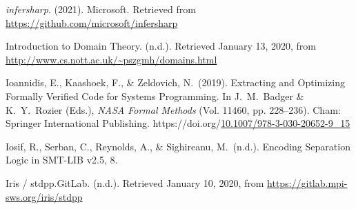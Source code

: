\documentclass[12pt,twoside]{article}
\begin{document}
{\begin{thebibliography}{1079}
\mdbibitemlabel{}\emph{infersharp}. (2021). Microsoft. Retrieved from \href{https://github.com/microsoft/infersharp}{{\ttfamily https://\hspace{0pt}github.\hspace{0pt}com/\hspace{0pt}microsoft/\hspace{0pt}infersharp}}%

\mdbibitemlabel{}Introduction to Domain Theory. (n.d.). Retrieved January 13, 2020, from \href{http://www.cs.nott.ac.uk/~pszgmh/domains.html}{{\ttfamily http://\hspace{0pt}www.\hspace{0pt}cs.\hspace{0pt}nott.\hspace{0pt}ac.\hspace{0pt}uk/\hspace{0pt}\textasciitilde{}pszgmh/\hspace{0pt}domains.\hspace{0pt}html}}%

\mdbibitemlabel{}Ioannidis, E., Kaashoek, F., \& Zeldovich, N.~(2019). Extracting and Optimizing Formally Verified Code for Systems Programming. In J.~M.~Badger \& K.~Y.~Rozier (Eds.), \emph{NASA Formal Methods} (Vol. 11460, pp. 228–236). Cham: Springer International Publishing. https://doi.org/\href{https://dx.doi.org/10.1007/978-3-030-20652-9_15}{10.1007/978-3-030-20652-9\_15}%

\mdbibitemlabel{}Iosif, R., Serban, C., Reynolds, A., \& Sighireanu, M.~(n.d.). Encoding Separation Logic in SMT-LIB v2.5, 8.%

\mdbibitemlabel{}Iris / stdpp.GitLab. (n.d.). Retrieved January 10, 2020, from \href{https://gitlab.mpi-sws.org/iris/stdpp}{{\ttfamily https://\hspace{0pt}gitlab.\hspace{0pt}mpi-\hspace{0pt}sws.\hspace{0pt}org/\hspace{0pt}iris/\hspace{0pt}stdpp}}%


\end{thebibliography}}
\end{document}
